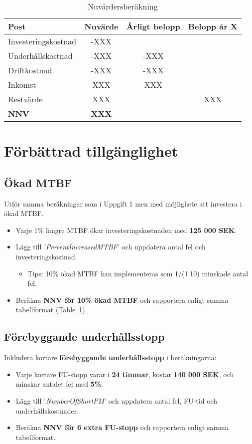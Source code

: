 \documentclass[a4paper,12pt]{exam}
\begin{document}
\begin{table}[h]
    \centering
    \begin{tabular}{lccc}
        \toprule
        \textbf{Post} & \textbf{Nuvärde} & \textbf{Årligt belopp} & \textbf{Belopp år X} \\
        \midrule
        Investeringskostnad & -XXX &  &  \\
        Underhållskostnad & -XXX & -XXX &  \\
        Driftkostnad & -XXX & -XXX &  \\
        Inkomst & XXX & XXX &  \\
        Restvärde & XXX &  &  XXX\\
        \textbf{NNV} & \textbf{XXX} &  &  \\
        \bottomrule
    \end{tabular}
    \caption{Nuvärdersberäkning}
    \label{NPVtable}
\end{table}


\section{Förbättrad tillgänglighet}
\subsection{Ökad MTBF}
Utför samma beräkningar som i Uppgift 1 men med möjlighete att investera i ökad MTBF. 
\begin{itemize}
    \item Varje 1\% längre MTBF ökar investeringskostnaden med \textbf{125 000 SEK}. 
    \item Lägg till '\emph{PercentIncreasedMTBF}' och uppdatera antal fel och investeringskostnad.
    \begin{itemize}
        \item Tips: 10\% ökad MTBF kan implementeras som 1/(1.10) minskade antal fel.
    \end{itemize}
    \item Beräkna \textbf{NNV för 10\% ökad MTBF} och rapportera enligt samma tabellformat (Table~\ref{NPVtable}).
\end{itemize}

\subsection{Förebyggande underhållsstopp}
Inkludera kortare \textbf{förebyggande underhållsstopp} i beräkningarna:
\begin{itemize}
    \item Varje kortare FU-stopp varar i \textbf{24 timmar}, kostar \textbf{140 000 SEK}, och minskar antalet fel med \textbf{5\%}.
    \item Lägg till '\emph{NumberOfShortPM}' och uppdatera antal fel, FU-tid och underhållskostnader.    
    \item Beräkna \textbf{NNV för 6 extra FU-stopp} och rapportera enligt samma tabellformat.
\end{itemize}
\end{document}
